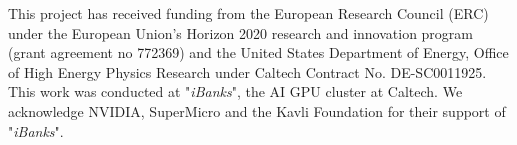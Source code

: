 \documentclass[11pt,twoside,a4paper,cmspaper]{cms-tdr}
\begin{document}

\begin{acknowledgments}
This project has received funding from the European Research Council (ERC) under the European Union’s Horizon 2020 research and innovation program (grant agreement no 772369) and the United States Department of Energy, Office of High Energy Physics Research under Caltech Contract No. DE-SC0011925. This work was conducted at "\textit{iBanks}", the AI GPU cluster at Caltech. We acknowledge NVIDIA, SuperMicro and the Kavli Foundation for their support of "\textit{iBanks}".
\end{acknowledgments}

\end{document}
